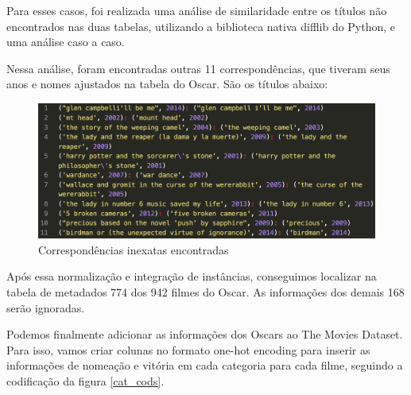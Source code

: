             Para esses casos, foi realizada uma análise de similaridade entre os títulos não encontrados nas duas tabelas, utilizando a biblioteca nativa difflib do Python, e uma análise caso a caso.

            Nessa análise, foram encontradas outras 11 correspondências, que tiveram seus anos e nomes ajustados na tabela do Oscar. São os títulos abaixo:\newline

            \begin{figure}[htb]
            	\caption{\label{corresp}Correspondências inexatas encontradas}
            	\begin{center}
            		\includegraphics[scale=0.35]{corresp.png}
            	\end{center}
            \end{figure}

            Após essa normalização e integração de instâncias, conseguimos localizar na tabela de metadados 774 dos 942 filmes do Oscar. As informações dos demais 168 serão ignoradas.

            Podemos finalmente adicionar as informações dos Oscars ao The Movies Dataset. Para isso, vamos criar colunas no formato one-hot encoding para inserir as informações de nomeação e vitória em cada categoria para cada filme, seguindo a codificação da figura \ref{cat_cods}.

